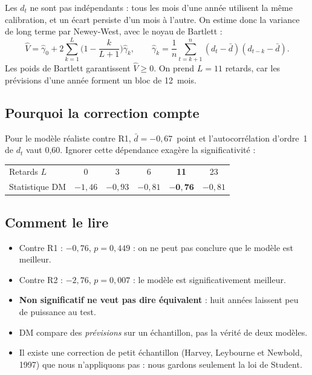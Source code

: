 \documentclass[11pt,a4paper]{article}
\begin{document}
Les $d_t$ ne sont pas indépendants : tous les mois d'une année utilisent la même calibration, et un écart persiste d'un mois à l'autre. On estime donc la variance de long terme par Newey-West, avec le noyau de Bartlett :
\[
\hat V = \hat\gamma_0 + 2\sum_{k=1}^{L}\Big(1 - \frac{k}{L+1}\Big)\hat\gamma_k,
\qquad
\hat\gamma_k = \frac1n\sum_{t=k+1}^{n}(d_t - \bar d)(d_{t-k} - \bar d).
\]
Les poids de Bartlett garantissent $\hat V \ge 0$. On prend $L = 11$ retards, car les prévisions d'une année forment un bloc de 12~mois.

\subsection{Pourquoi la correction compte}

Pour le modèle réaliste contre R1, $\bar d = -0{,}67$~point et l'autocorrélation d'ordre~1 de $d_t$ vaut 0,60. Ignorer cette dépendance exagère la significativité :

\begin{center}
\begin{tabular}{lccccc}
\toprule
Retards $L$ & 0 & 3 & 6 & \textbf{11} & 23 \\
Statistique DM & $-1{,}46$ & $-0{,}93$ & $-0{,}81$ & $\mathbf{-0{,}76}$ & $-0{,}81$ \\
\bottomrule
\end{tabular}
\end{center}

\subsection{Comment le lire}

\begin{itemize}
\item Contre R1 : $-0{,}76$, $p = 0{,}449$ : on ne peut pas conclure que le modèle est meilleur.
\item Contre R2 : $-2{,}76$, $p = 0{,}007$ : le modèle est significativement meilleur.
\item \textbf{Non significatif ne veut pas dire équivalent} : huit années laissent peu de puissance au test.
\item DM compare des \emph{prévisions} sur un échantillon, pas la vérité de deux modèles.
\item Il existe une correction de petit échantillon (Harvey, Leybourne et Newbold, 1997) que nous n'appliquons pas : nous gardons seulement la loi de Student.
\end{itemize}
\end{document}
